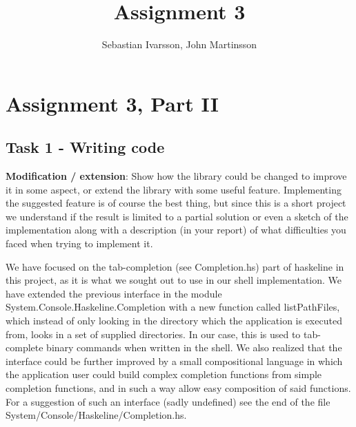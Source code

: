 \documentclass[11pt,a4paper]{article}
\begin{document}
\pagestyle{fancy}

\renewcommand{\headrulewidth}{0pt} \setlength{\headsep}{30pt}
\setlength{\headheight}{30pt}

\title{Assignment 3}
\author{Sebastian Ivarsson, John Martinsson}
\maketitle
\thispagestyle{fancy}

\section{Assignment 3, Part II}

\subsection{Task 1 - Writing code}
\textbf{Modification / extension}: Show how the library could be changed to improve it in
some aspect, or extend the library with some useful feature. Implementing the
suggested feature is of course the best thing, but since this is a short project
we understand if the result is limited to a partial solution or even a sketch of
the implementation along with a description (in your report) of what
difficulties you faced when trying to implement it.

We have focused on the tab-completion (see Completion.hs) part of haskeline in
this project, as it is what we sought out to use in our shell implementation. We
have extended the previous interface in the module
System.Console.Haskeline.Completion with a new function called listPathFiles,
which instead of only looking in the directory which the application is executed
from, looks in a set of supplied directories. In our case, this is used to
tab-complete binary commands when written in the shell. We also realized that
the interface could be further improved by a small compositional language in
which the application user could build complex completion functions from simple
completion functions, and in such a way allow easy composition of said
functions. For a suggestion of such an interface (sadly undefined) see the end
of the file System/Console/Haskeline/Completion.hs.
\end{document}
